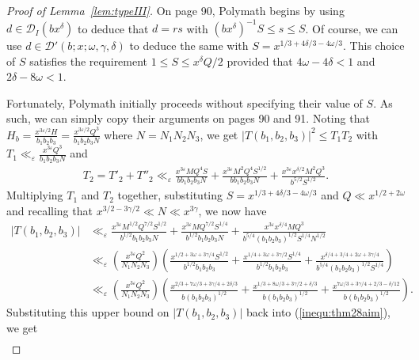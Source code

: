 \documentclass{amsart}
\numberwithin{equation}{section}
\begin{document}
\begin{proof}[Proof of Lemma~\ref{lem:typeIII}]
\medskip On page 90, Polymath begins by using $d \in \mathcal{D}_I(bx^\delta)$ to deduce that $d=rs$ with   $(bx^\delta)^{-1} S \leq s \leq S$. Of course, we can use $d \in \mathcal{D}'(b;x;\omega,\gamma,\delta)$ to deduce the same with $S= x^{1/3+4\delta/3 -4\omega/3}$. This choice of $S$ satisfies the requirement $1 \leq S \leq x^\delta Q/2$ provided that $4\omega -4\delta <1$ and $2\delta  -8\omega  <   1$.

\medskip Fortunately, Polymath initially proceeds without specifying their value of $S$. As such, we can simply copy their arguments on pages 90 and 91. Noting that $H_b= \frac{x^{3\varepsilon/2}H}{b_1b_2b_3}=  \frac{x^{3\varepsilon/2}Q^3}{b_1b_2b_3 N}$ where $N=N_1N_2N_3$, we get $| T(b_1,b_2,b_3)|^2\leq T_1T_2$ with $T_1 \ll_\varepsilon \frac{x^{3\varepsilon }Q^3 }{b_1b_2b_3 N}$ and
\begin{align*}
T_2=T'_2+T''_2 \ll_\varepsilon \frac{x^{3\varepsilon}  MQ^4 S}{b b_1b_2b_3 N}+
 \frac{x^{3\varepsilon} M^2Q^4S^{1/2} }{b b_1b_2b_3 N}+ \frac{x^{3\varepsilon}   x^{\delta/2}M^2Q^3}{b^{5/2}S^{1/2}}. 
\end{align*}
Multiplying $T_1$ and $T_2$ together, substituting $S= x^{1/3+4\delta/3 -4\omega/3}$ and $Q \ll x^{1/2+2\omega}$ and recalling that $x^{3/2-3\gamma/2 } \ll N \ll x^{3 \gamma }$, we now have 
\begin{align*}
| T(b_1,b_2,b_3)|  &\ll_\varepsilon    \frac{x^{3\varepsilon}  M^{1/2}Q^{7/2} S^{1/2}}{b^{1/2}  b_1b_2b_3  N }+
 \frac{x^{3\varepsilon} M Q^{7/2}S^{1/4} }{b^{1/2}  b_1b_2b_3  N }+ \frac{x^{3\varepsilon}    x^{\delta/4}M Q^3}{b^{5/4} (b_1b_2b_3)^{1/2}S^{1/4}N^{1/2}}  \\
 &\ll_\varepsilon  \left( \frac{x^{3\varepsilon}Q^2 }{N_1N_2N_3 }  \right)
  \left( \frac{   x^{1/2 +3\omega  +3\gamma/4 } S^{1/2}}{b^{1/2}  b_1b_2b_3     }+
 \frac{ x^{1/4 +3\omega  +3\gamma/2}  S^{1/4} }{b^{1/2}  b_1b_2b_3     }+ \frac{    x^{\delta/4 + 3/4+2\omega  +3\gamma/4 }    }{b^{5/4} (b_1b_2b_3)^{1/2}S^{1/4} }  \right)\\
  &\ll_\varepsilon  \left( \frac{x^{3\varepsilon}Q^2 }{N_1N_2N_3 }  \right)
  \left( \frac{   x^{2/3 +7\omega/3  +3\gamma/4  +2\delta/3 }  }{b   (b_1b_2b_3)^{1/2}     }+
 \frac{ x^{1/3 +8\omega/3  +3\gamma/2   +\delta/3 }   }{b   (b_1b_2b_3)^{1/2}   }+ \frac{    x^{7\omega/3  +3\gamma/4 +2/3 -\delta/12    }    }{b  (b_1b_2b_3)^{1/2}  }  \right).
\end{align*}
Substituting this upper bound on $| T(b_1,b_2,b_3)|$ back into (\ref{inequ:thm28aim}), we get 
\begin{align*}

\end{align*}
\end{proof}
\end{document}
